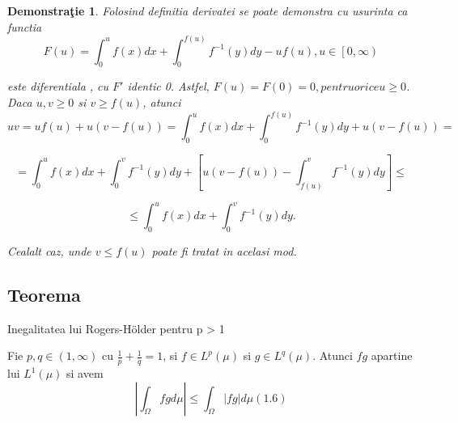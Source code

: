 \documentclass[a4paper,12pt,oneside]{report}
\newtheorem{demonstration}{Demonstra\c tie}
\begin{document}
\begin{demonstration}
Folosind definitia derivatei se poate demonstra cu usurinta ca functia 
\begin{displaymath}
  F\left ( u \right )= \int_{0}^{u}f\left ( x \right )dx + \int_{0}^{f\left ( u \right )}f^{-1}\left ( y \right )dy -uf\left ( u \right ), u \in \left [ 0,\infty  \right )
\end{displaymath}

este diferentiala , cu \({F}'\) identic 0. Astfel, \(F\left ( u \right )= F\left ( 0 \right )= 0, pentru orice u\geq 0\). 
	Daca \(u, v \geq 0\)  si \(v\geq f\left ( u \right )\), atunci 
\begin{displaymath}
  uv = uf\left ( u \right )+ u\left ( v- f\left ( u \right ) \right )=  \int_{0}^{u}f\left ( x \right )dx + \int_{0}^{f\left ( u \right )}f^{-1}\left ( y \right )dy + u\left ( v - f\left ( u \right ) \right ) =
\end{displaymath}

\begin{displaymath}
  = \int_{0}^{u}f\left ( x \right )dx + \int_{0}^{v}f^{-1}\left ( y \right )dy + \left [ u\left ( v-f\left ( u \right )  \right ) - \int_{f\left ( u \right )}^{v}f^{-1}\left ( y \right )dy\right ]\leq 
\end{displaymath}

\begin{displaymath}
  \leq \int_{0}^{u}f\left ( x \right )dx + \int_{0}^{v}f^{-1}\left ( y \right )dy.
\end{displaymath}



	Cealalt caz, unde \(v\leq f\left ( u \right )\) poate fi tratat in acelasi mod. 
\end{demonstration}

\subsection{Teorema}

Inegalitatea lui Rogers-Hölder pentru p > 1

Fie \(p,q \in \left ( 1, \infty  \right )\) cu \(\frac{1}{p} + \frac{1}{q} = 1\), si  \(f\in L^{p}\left ( \mu  \right )\) si \(g\in L^{q}\left ( \mu  \right )\). Atunci \(fg\) apartine lui \(L^{1}\left ( \mu  \right )\) si avem 
\begin{displaymath}
  \left | \int_{\Omega}^{} fg  d\mu \right |\leq \int_{\Omega}^{}\left | fg \right |d\mu (1.6) 
\end{displaymath}
\end{document}
